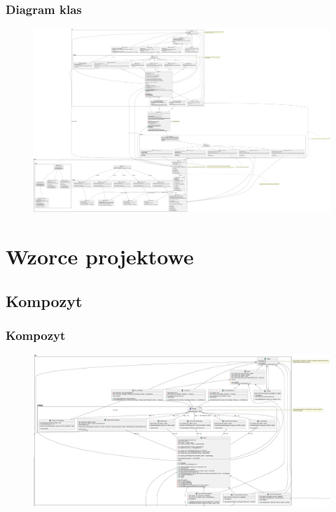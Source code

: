 \documentclass[
	11pt,]{beamer}
\begin{document}
\begin{frame}
	\frametitle{Diagram klas}
	
	\begin{figure}
		\includegraphics[height=0.7\textheight]{figures/class_diagram.pdf}
	\end{figure}
\end{frame}


\section{Wzorce projektowe}

\subsection{Kompozyt}

\begin{frame}
	\frametitle{Kompozyt}
	
	\begin{figure}
		\includegraphics[height=0.7\textheight]{figures/kompozyt.pdf}
	\end{figure}
\end{frame}
\end{document}
